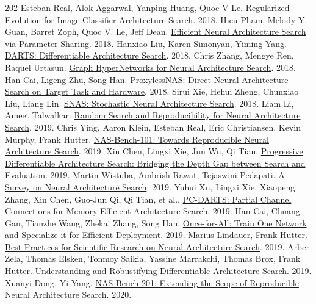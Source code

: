 \begin{thebibliography}{202}
 Esteban Real, Alok Aggarwal, Yanping Huang, Quoc V Le. \href{https://arxiv.org/abs/1802.01548}{Regularized Evolution for Image Classifier Architecture Search}. 2018.
 Hieu Pham, Melody Y. Guan, Barret Zoph, Quoc V. Le, Jeff Dean. \href{https://arxiv.org/abs/1802.03268}{Efficient Neural Architecture Search via Parameter Sharing}. 2018.
 Hanxiao Liu, Karen Simonyan, Yiming Yang. \href{https://arxiv.org/abs/1806.09055}{DARTS: Differentiable Architecture Search}. 2018.
 Chris Zhang, Mengye Ren, Raquel Urtasun. \href{https://arxiv.org/abs/1810.05749v3}{Graph HyperNetworks for Neural Architecture Search}. 2018.
 Han Cai, Ligeng Zhu, Song Han. \href{https://arxiv.org/abs/1812.00332v2}{ProxylessNAS: Direct Neural Architecture Search on Target Task and Hardware}. 2018.
 Sirui Xie, Hehui Zheng, Chunxiao Liu, Liang Lin. \href{https://arxiv.org/abs/1812.09926v3}{SNAS: Stochastic Neural Architecture Search}. 2018.
 Liam Li, Ameet Talwalkar. \href{https://arxiv.org/abs/1902.07638v3}{Random Search and Reproducibility for Neural Architecture Search}. 2019.
 Chris Ying, Aaron Klein, Esteban Real, Eric Christiansen, Kevin Murphy, Frank Hutter. \href{https://arxiv.org/abs/1902.09635}{NAS-Bench-101: Towards Reproducible Neural Architecture Search}. 2019.
 Xin Chen, Lingxi Xie, Jun Wu, Qi Tian. \href{https://arxiv.org/abs/1904.12760v1}{Progressive Differentiable Architecture Search: Bridging the Depth Gap between Search and Evaluation}. 2019.
 Martin Wistuba, Ambrish Rawat, Tejaswini Pedapati. \href{https://arxiv.org/abs/1905.01392v2}{A Survey on Neural Architecture Search}. 2019.
 Yuhui Xu, Lingxi Xie, Xiaopeng Zhang, Xin Chen, Guo-Jun Qi, Qi Tian, et al.. \href{https://arxiv.org/abs/1907.05737v4}{PC-DARTS: Partial Channel Connections for Memory-Efficient Architecture Search}. 2019.
 Han Cai, Chuang Gan, Tianzhe Wang, Zhekai Zhang, Song Han. \href{https://arxiv.org/abs/1908.09791v5}{Once-for-All: Train One Network and Specialize it for Efficient Deployment}. 2019.
 Marius Lindauer, Frank Hutter. \href{https://arxiv.org/abs/1909.02453}{Best Practices for Scientific Research on Neural Architecture Search}. 2019.
 Arber Zela, Thomas Elsken, Tonmoy Saikia, Yassine Marrakchi, Thomas Brox, Frank Hutter. \href{https://arxiv.org/abs/1909.09656v2}{Understanding and Robustifying Differentiable Architecture Search}. 2019.
 Xuanyi Dong, Yi Yang. \href{https://arxiv.org/abs/2001.00326}{NAS-Bench-201: Extending the Scope of Reproducible Neural Architecture Search}. 2020.

\end{thebibliography}
